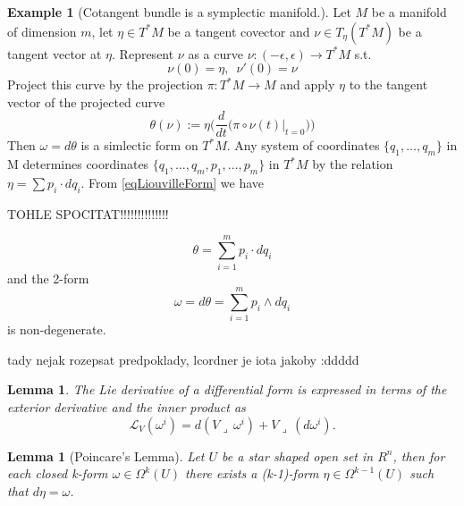 \documentclass{article}
\newtheorem{lemma}[theorem]{Lemma} %
\theoremstyle{definition}
\newtheorem{example}[theorem]{Example}
\begin{document}
\begin{example}[Cotangent bundle is a symplectic manifold.]
    Let $M$ be a manifold of dimension $m$, let $\eta \in T^*M$ be a tangent covector and $\nu \in T_\eta(T^*M)$ be a tangent vector at $\eta$. Represent $\nu$ as a curve $\nu:(-\epsilon, \epsilon) \rightarrow T^*M$ s.t. 
    \begin{equation*}
        \nu(0) = \eta,\,\,\, \nu'(0) = \nu
    \end{equation*}
    Project this curve by the projection $\pi:T^*M \rightarrow M$ and apply $\eta$ to the tangent vector of the projected curve 
    \begin{equation}\label{eqLiouvilleForm}
        \theta(\nu) := \eta \Big(\frac{d}{dt}\big(\pi \circ \nu(t)\vert_{t=0} \big)\Big)
    \end{equation}
    Then $\omega = d \theta$ is a simlectic form on $T^*M$. Any system of coordinates $\{q_1,\dots, q_m\}$ in M determines coordinates $\{q_1,\dots, q_m, p_1, \dots, p_m\}$ in $T^*M$ by the relation $\eta = \sum p_i \cdot dq_i$. From \eqref{eqLiouvilleForm} we have 
    
    
    TOHLE SPOCITAT!!!!!!!!!!!!!!
    
    \begin{equation*}
        \theta = \sum_{i=1}^m p_i \cdot dq_i
    \end{equation*}
    and the 2-form
    \begin{equation*}
        \omega = d \theta = \sum_{i=1}^m p_i \wedge dq_i
    \end{equation*}
    is non-degenerate.
\end{example}

tady nejak rozepsat predpoklady, lcordner je iota jakoby :ddddd

\begin{lemma}\label{lemmaPocitaniSLieDerivative}
    The Lie derivative of a differential form is expressed in terms of the exterior derivative and the inner product as
    \begin{equation*}
        \mathcal{L}_V(\omega^i) = d(V \lrcorner \, \omega^i) + V \lrcorner \, (d\omega^i).
    \end{equation*}
\end{lemma}

\begin{lemma}[Poincare's Lemma]\label{lemmaPoincare}
    Let $U$ be a star shaped open set in $R^n$, then for each closed k-form $\omega \in \Omega^k(U)$ there exists a (k-1)-form $\eta \in \Omega^{k-1}(U)$ such that $d\eta = \omega$.
\end{lemma}
\end{document}

